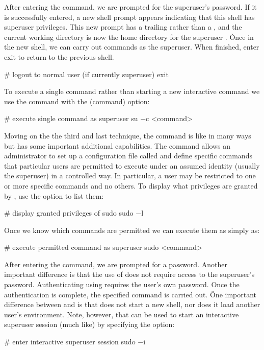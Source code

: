 After entering the command, we are prompted for the superuser's password. If it is successfully entered, a new shell
prompt appears indicating that this shell has superuser privileges. This new prompt has a trailing \code{$\#$} rather than
a \code{$\$$}, and the current working directory is now the home directory for the superuser . \v

Once in the new shell, we can carry out commands as the superuser. When finished, enter exit to return to the previous
shell.
\begin{bash}
# logout to normal user (if currently superuser)
exit
\end{bash}

To execute a single command rather than starting a new interactive command we use the  command with the
 (command) option:
\begin{bash}
# execute single command as superuser
su $-$c <command>
\end{bash}

Moving on the the third and last technique, the  command is like  in many ways but has some
important additional capabilities. The  command allows an administrator to set up a configuration file
called  and define specific commands that particular users are permitted to execute under an
assumed identity (usually the superuser) in a controlled way. In particular, a user may be restricted to one or more
specific commands and no others. To display what privileges are granted by , use the  option to
list them:
\begin{bash}
# display granted privileges of sudo
sudo $-$l
\end{bash}

Once we know which commands are permitted we can execute them as simply as:
\begin{bash}
# execute permitted command as superuser
sudo <command>
\end{bash}

After entering the command, we are prompted for a password. Another important difference is that the use of  does not require access to the superuser's password. Authenticating using  requires the user's own
password. Once the authentication is complete, the specified command is carried out. \v

One important difference between  and  is that  does not start a new shell, nor does
it load another user's environment. Note, however, that  can be used to start an interactive superuser
session (much like) by specifying the  option:
\begin{bash}
# enter interactive superuser session
sudo $-$i
\end{bash}

